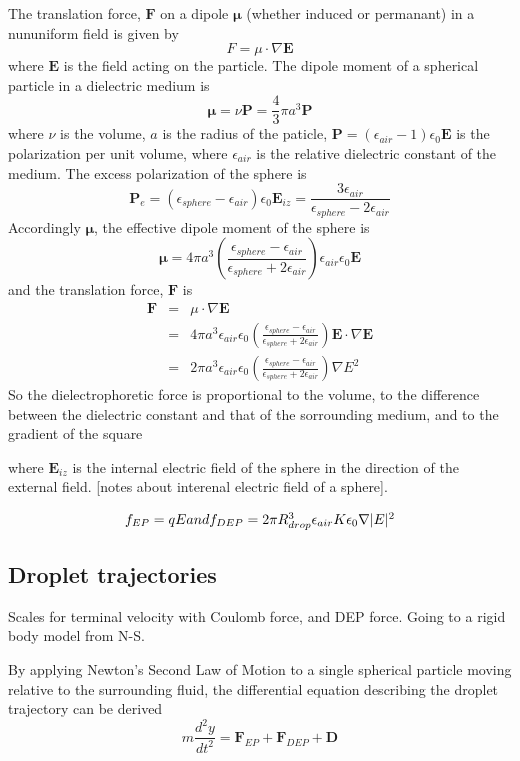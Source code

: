 \documentclass{jfm}
\begin{document}
The translation force, $\mathbf{F}$ on a dipole $\mathbf{\mu}$ (whether induced or permanant) in a nununiform field is given by
\[F = \mu \cdot \nabla \mathbf{E} \]
where $\mathbf{E}$ is the field acting on the particle. The dipole moment of a spherical particle in a dielectric medium is 
\[ \mathbf{\mu}  = \nu \mathbf{P} = \frac{4}{3} \pi a^3 \mathbf{P} \]
where $\nu$ is the volume, $a$ is the radius of the paticle, $\mathbf{P} = \left(\epsilon_{air} -1 \right)\epsilon_0 \mathbf{E}$ is the polarization per unit volume, where $\epsilon_{air}$ is the relative dielectric constant of the medium. The excess polarization of the sphere is
\[ \mathbf{P}_e = \left(\epsilon_{sphere} - \epsilon_{air} \right) \epsilon_0 \mathbf{E}_{iz} = \frac{3 \epsilon_{air}}{\epsilon_{sphere} - 2 \epsilon_{air}}\]
Accordingly $\mathbf{\mu}$, the effective dipole moment of the sphere is 
\[ \mathbf{\mu} = 4 \pi a^3 \left( \frac{\epsilon_{sphere}- \epsilon_{air}}{\epsilon_{sphere} + 2 \epsilon_{air}}\right) \epsilon_{air} \epsilon_0 \mathbf{E} \]
and the translation force, $\mathbf{F}$ is
\begin{eqnarray}
\mathbf{F} &=& \mu \cdot \nabla \mathbf{E}\\
		   &=& 4 \pi a^3 \epsilon_{air} \epsilon_0 \left( \frac{\epsilon_{sphere}- \epsilon_{air}}{\epsilon_{sphere} + 2 \epsilon_{air}}\right) \mathbf{E} \cdot \nabla \mathbf{E}\\
		   &=& 2 \pi a^3 \epsilon_{air} \epsilon_0 \left( \frac{\epsilon_{sphere}- \epsilon_{air}}{\epsilon_{sphere} + 2 \epsilon_{air}}\right) \nabla E^2
\end{eqnarray}
So the dielectrophoretic force is proportional to the volume, to the difference between the dielectric constant and that of the sorrounding medium, and to the gradient of the square

where $\mathbf{E}_{iz}$ is the internal electric field of the sphere in the direction of the external field. [notes about interenal electric field of a sphere].  

\[f_{EP} = qE$$ and $$f_{DEP} = 2 \pi  R_{drop}^3 \epsilon_{air}  K  \epsilon_0  \nabla |E|^2\]

\subsection{Droplet trajectories}
Scales for terminal velocity with Coulomb force, and DEP force. Going to a rigid body model from N-S.

By applying Newton's Second Law of Motion to a single spherical particle moving relative to the surrounding fluid, the differential equation describing the droplet trajectory can be derived
\[m\frac{d^2y}{dt^2} = \mathbf{F}_{EP} + \mathbf{F}_{DEP} + \mathbf{D}\] 
\end{document}
